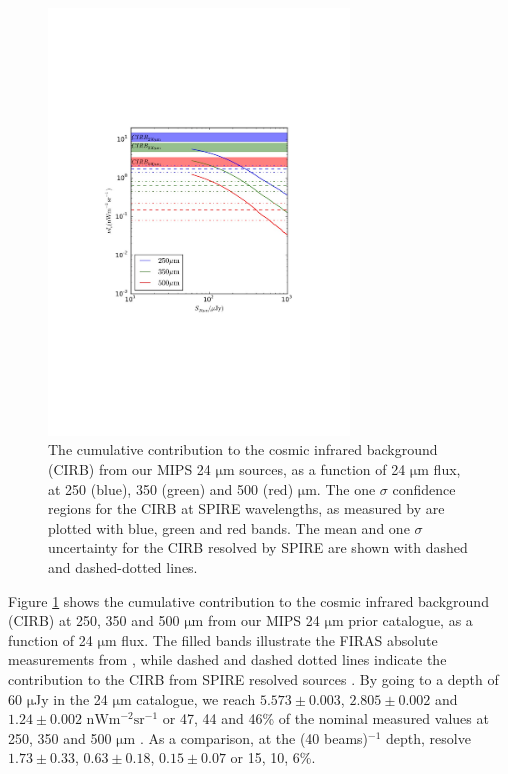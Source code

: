 \documentclass[useAMS,usenatbib]{mnras}
\begin{document}
\begin{figure} 
\includegraphics[width=8cm]{CIRB}
\caption{The cumulative contribution to the cosmic infrared background (CIRB) from our MIPS 24 $\mathrm{\mu m}$ sources, as a function of 24 $\mathrm{\mu m}$ flux, at 250 (blue), 350 (green) and 500 (red) $\mathrm{\mu m}$. The one $\sigma$ confidence regions for the CIRB at SPIRE wavelengths, as measured by \protect\cite{Lagache:2000} are plotted with blue, green and red bands. The mean and one $\sigma$ uncertainty for the CIRB resolved by SPIRE \protect\citep{Oliver:2010} are shown with dashed and dashed-dotted lines.}\label{fig:cirb}
\end{figure}
Figure \ref{fig:cirb} shows the cumulative contribution to the cosmic infrared background (CIRB) at 250, 350 and 500 $\mathrm{\mu m}$ from our MIPS 24 $\mathrm{\mu m}$ prior catalogue, as a function of 24 $\mathrm{\mu m}$ flux. The filled bands illustrate the FIRAS
absolute measurements from \cite{Lagache:2000}, while dashed and dashed dotted lines indicate the contribution to the CIRB from SPIRE resolved sources \citep{Oliver:2010}. By going to a depth of 60 $\mathrm{\mu}$Jy in the 24 $\mathrm{\mu m}$ catalogue, we reach $5.573\pm0.003$, $2.805\pm0.002$ and $1.24\pm0.002$ $\mathrm{nWm^{-2}sr^{-1}}$ or 47, 44 and 46\% of the nominal measured values at 250, 350 and 500 $\mathrm{\mu m}$ \citep{Lagache:2000}. As a comparison, at the (40 beams)$^{-1}$ depth, \citep{Oliver:2010} resolve $1.73\pm0.33$, $0.63\pm0.18$, $0.15\pm0.07$ or 15, 10, 6\%.
\end{document}
